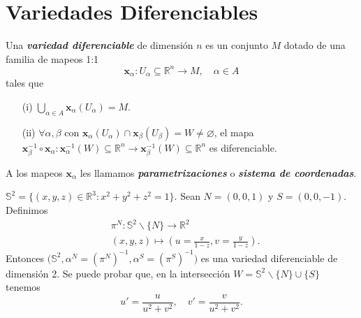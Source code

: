 \section{Variedades Diferenciables}

\begin{definition}
Una \textit{\textbf{variedad diferenciable}} de dimensi\'on $n$ es un conjunto $M$ dotado de una familia de mapeos 1:1
\begin{equation*}
    \mathbf{x}_\alpha\colon U_\alpha\subseteq\mathbb{R}^n\to M,\quad\alpha\in A
\end{equation*}
tales que
\begin{enumerate}
    \item[(i)] $\displaystyle{\bigcup_{\alpha\in A}\mathbf{x}_\alpha(U_\alpha)=M}$.
    \item[(ii)] $\forall\alpha,\beta$ con $\mathbf{x}_\alpha(U_\alpha)\cap\mathbf{x}_\beta(U_\beta)=W\neq\varnothing$, el mapa $\mathbf{x}_\beta^{-1}\circ\mathbf{x}_\alpha\colon\mathbf{x}_\alpha^{-1}(W)\subseteq\mathbb{R}^n\to\mathbf{x}_\beta^{-1}(W)\subseteq\mathbb{R}^n$ es diferenciable.
\end{enumerate}
\end{definition}
\begin{definition}
A los mapeos $\mathbf{x}_\alpha$ les llamamos \textit{\textbf{parametrizaciones}} o \textit{\textbf{sistema de coordenadas}}.   
\end{definition}

\begin{example}
$\mathbb{S}^2=\{(x,y,z)\in\mathbb{R}^3\colon x^2+y^2+z^2=1\}$. Sean $N=(0,0,1)$ y $S=(0,0,-1)$. Definimos
\begin{align*}
    &\pi^N\colon\mathbb{S}^2\backslash\{N\}\to\mathbb{R}^2\\
    &(x,y,z)\mapsto\left(u=\frac{x}{1-z},v=\frac{y}{1-z}\right).
\end{align*}
Entonces $\bigl(\mathbb{S}^2,\alpha^N=(\pi^N)^{-1},\alpha^S=(\pi^S)^{-1}\bigl)$ es una variedad diferenciable de dimensi\'on 2. Se puede probar que, en la intersecci\'on $W=\mathbb{S}^2\backslash\{N\}\cup\{S\}$ tenemos 
\begin{equation*}
    u'=\frac{u}{u^2+v^2},\quad v'=\frac{v}{u^2+v^2}.
\end{equation*}
\end{example}

